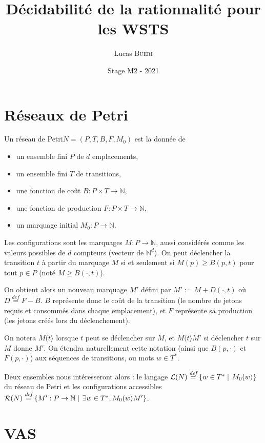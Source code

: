 \documentclass[a4paper,final]{article}
\title{Décidabilité de la rationnalité pour les WSTS}
\author{Lucas \textsc{Bueri}}
\date{Stage M2 - 2021}
\theoremstyle{definition}
\let\geq\geqslant
\newcommand{\set}[2]{\left\{#1\mathrel{\left|\vphantom{#1}\vphantom{#2}\right.}#2\right\}}
\newcommand{\defeq}{\ensuremath{\stackrel{\textit{def}}{=}}}
\newcommand{\N}{\ensuremath{\mathbb{N}}}
\newcommand{\petri}{réseau de Petri\xspace}
\newcommand{\fire}[2]{\ensuremath{#1 (#2\rangle}}
\newcommand{\lang}{\ensuremath{\mathcal{L}}}
\newcommand{\conf}[1]{\ensuremath{\mathcal{R}(#1)}}
\begin{document}
\maketitle


\section{Réseaux de Petri}

Un \petri $N = (P,T,B,F,M_0)$ est la donnée de
\begin{itemize}
    \item un ensemble fini $P$ de $d$ emplacements,
    \item un ensemble fini $T$ de transitions,
    \item une fonction de coût $B: P\times T\to\N$,
    \item une fonction de production $F: P\times T\to\N$,
    \item un marquage initial $M_0: P\to\N$.
\end{itemize}

Les configurations sont les marquages $M: P\to\N$, aussi considérés comme les valeurs possibles de $d$ compteurs (vecteur de $\N^d$).
On peut déclencher la transition $t$ à partir du marquage $M$ si et
seulement si $M(p)\geq B(p,t)$ pour tout $p\in P$ (noté $M\geq B(\cdot,t)$).

On obtient alors un nouveau marquage $M'$ défini par $M':=M+D(\cdot,t)$ où $D\defeq F-B$. 
$B$ représente donc le coût de la transition (le nombre de jetons requis et consommés dans chaque emplacement), et $F$ représente sa production (les jetons créés lors du déclenchement).

On notera $\fire{M}{t}$ lorsque $t$ peut se déclencher sur $M$, et $\fire{M}{t}M'$ si déclencher $t$ sur $M$ donne $M'$.
On étendra naturellement cette notation (ainsi que $B(p,\cdot)$ et $F(p,\cdot)$) aux séquences de transitions, ou mots $w\in T^\ast$.

Deux ensembles nous intéresseront alors : le langage $\lang(N)\defeq \set{w\in T^\ast} {\fire{M_0}{w}}$ du \petri et les configurations accessibles $\conf{N}\defeq \set{M':P\to\N}{\exists w\in T^\ast, \fire{M_0}{w}M'}$.


\section{VAS}
\end{document}
